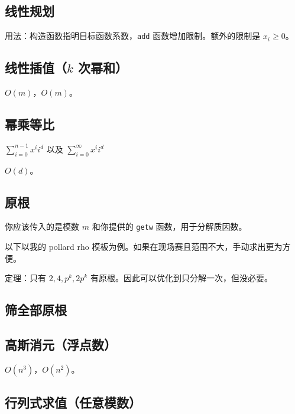 \documentclass[12pt]{ctexart}
\begin{document}

\subsection{线性规划}
用法：构造函数指明目标函数系数，\verb|add| 函数增加限制。额外的限制是 $x_i\ge 0$。


\subsection{线性插值（$k$ 次幂和）}

$O(m)$，$O(m)$。



\subsection{幂乘等比}

$\sum\limits_{i=0}^{n-1}x^ii^d$ 以及 $\sum\limits_{i=0}^{\infty}x^ii^d$

$O(d)$。




\subsection{原根}

你应该传入的是模数 $m$ 和你提供的 \verb|getw| 函数，用于分解质因数。

以下以我的 pollard rho 模板为例。如果在现场赛且范围不大，手动求出更为方便。

定理：只有 $2,4,p^k,2p^k$ 有原根。因此可以优化到只分解一次，但没必要。



\subsection{筛全部原根}



\subsection{高斯消元（浮点数）}

$O(n^3)$，$O(n^2)$。



\subsection{行列式求值（任意模数）}
\end{document}
